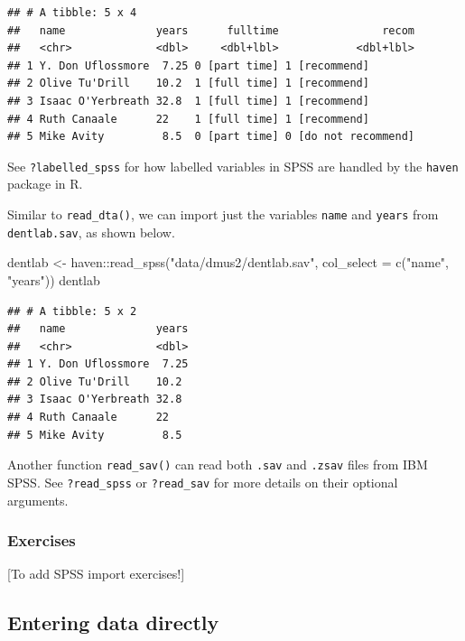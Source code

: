 \documentclass[
]{book}
\newenvironment{Shaded}{\begin{snugshade}}{\end{snugshade}}
\newcommand{\AttributeTok}[1]{\textcolor[rgb]{0.77,0.63,0.00}{#1}}
\newcommand{\FunctionTok}[1]{\textcolor[rgb]{0.00,0.00,0.00}{#1}}
\newcommand{\NormalTok}[1]{#1}
\newcommand{\OtherTok}[1]{\textcolor[rgb]{0.56,0.35,0.01}{#1}}
\newcommand{\SpecialCharTok}[1]{\textcolor[rgb]{0.00,0.00,0.00}{#1}}
\newcommand{\StringTok}[1]{\textcolor[rgb]{0.31,0.60,0.02}{#1}}
\begin{document}
\begin{verbatim}
## # A tibble: 5 x 4
##   name              years      fulltime                recom
##   <chr>             <dbl>     <dbl+lbl>            <dbl+lbl>
## 1 Y. Don Uflossmore  7.25 0 [part time] 1 [recommend]       
## 2 Olive Tu'Drill    10.2  1 [full time] 1 [recommend]       
## 3 Isaac O'Yerbreath 32.8  1 [full time] 1 [recommend]       
## 4 Ruth Canaale      22    1 [full time] 1 [recommend]       
## 5 Mike Avity         8.5  0 [part time] 0 [do not recommend]
\end{verbatim}

See \texttt{?labelled\_spss} for how labelled variables in SPSS are handled by the \texttt{haven} package in R.

Similar to \texttt{read\_dta()}, we can import just the variables \texttt{name} and \texttt{years} from \texttt{dentlab.sav}, as shown below.

\begin{Shaded}
\begin{Highlighting}[]
\NormalTok{dentlab }\OtherTok{\textless{}{-}}\NormalTok{ haven}\SpecialCharTok{::}\FunctionTok{read\_spss}\NormalTok{(}\StringTok{"data/dmus2/dentlab.sav"}\NormalTok{, }
                            \AttributeTok{col\_select =} \FunctionTok{c}\NormalTok{(}\StringTok{"name"}\NormalTok{, }\StringTok{"years"}\NormalTok{))}
\NormalTok{dentlab}
\end{Highlighting}
\end{Shaded}

\begin{verbatim}
## # A tibble: 5 x 2
##   name              years
##   <chr>             <dbl>
## 1 Y. Don Uflossmore  7.25
## 2 Olive Tu'Drill    10.2 
## 3 Isaac O'Yerbreath 32.8 
## 4 Ruth Canaale      22   
## 5 Mike Avity         8.5
\end{verbatim}

Another function \texttt{read\_sav()} can read both \texttt{.sav} and \texttt{.zsav} files from IBM SPSS. See \texttt{?read\_spss} or \texttt{?read\_sav} for more details on their optional arguments.

\hypertarget{exercises-3}{%
\subsubsection{Exercises}\label{exercises-3}}

{[}To add SPSS import exercises!{]}

\hypertarget{entering-data-directly}{%
\subsection{Entering data directly}\label{entering-data-directly}}
\end{document}
